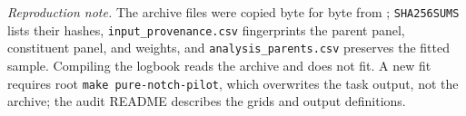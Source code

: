 \textit{Reproduction note.} The archive files were copied byte for byte from
; \texttt{SHA256SUMS} lists
their hashes, \texttt{input\_provenance.csv} fingerprints the parent panel,
constituent panel, and weights, and \texttt{analysis\_parents.csv} preserves
the fitted sample. Compiling the logbook reads the archive and does not fit. A
new fit requires root \texttt{make pure-notch-pilot}, which overwrites the
task output, not the archive; the audit README describes the grids and output
definitions.
